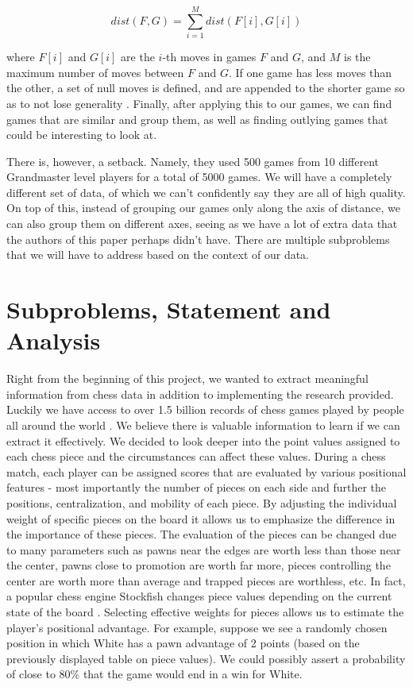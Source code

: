 \documentclass[12pt]{article}
\begin{document}
    \begin{equation}
        dist(F,G) = \sum_{i=1}^M dist(F[i], G[i])
    \end{equation}

    where $F[i]$ and $G[i]$ are the $i$-th moves in games $F$ and $G$, and $M$ is the maximum number of moves between $F$ and $G$. If one game has less moves than the other, a set of null moves is defined, and are appended to the shorter game so as to not lose generality \cite{main}. Finally, after applying this to our games, we can find games that are similar and group them, as well as finding outlying games that could be interesting to look at.

    There is, however, a setback. Namely, they used 500 games from 10 different Grandmaster level players for a total of 5000 games. We will have a completely different set of data, of which we can't confidently say they are all of high quality. On top of this, instead of grouping our games only along the axis of distance, we can also group them on different axes, seeing as we have a lot of extra data that the authors of this paper perhaps didn't have. There are multiple subproblems that we will have to address based on the context of our data.

    \section{Subproblems, Statement and Analysis}

    Right from the beginning of this project, we wanted to extract meaningful information from chess data in addition to implementing the research provided. Luckily we have access to over 1.5 billion records of chess games played by people all around the world \cite{lichessdb}. We believe there is valuable information to learn if we can extract it effectively. We decided to look deeper into the point values assigned to each chess piece and the circumstances can affect these values. During a chess match, each player can be assigned scores that are evaluated by various positional features - most importantly the number of pieces on each side and further the positions, centralization, and mobility of each piece. By adjusting the individual weight of specific pieces on the board it allows us to emphasize the difference in the importance of these pieces. The evaluation of the pieces can be changed due to many parameters such as pawns near the edges are worth less than those near the center, pawns close to promotion are worth far more, pieces controlling the center are worth more than average and trapped pieces are worthless, etc. In fact, a popular chess engine Stockfish changes piece values depending on the current state of the board \cite{stockfish}. Selecting effective weights for pieces allows us to estimate the player's positional advantage. For example, suppose we see a randomly chosen position in which White has a pawn advantage of 2 points (based on the previously displayed table on piece values). We could possibly assert a probability of close to 80\% that the game would end in a win for White.
\end{document}
